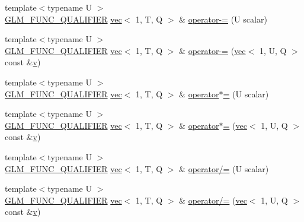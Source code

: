 \begin{DoxyCompactItemize}
{\footnotesize template$<$typename U $>$ }\\\mbox{\hyperlink{setup_8hpp_a33fdea6f91c5f834105f7415e2a64407}{G\+L\+M\+\_\+\+F\+U\+N\+C\+\_\+\+Q\+U\+A\+L\+I\+F\+I\+ER}} \mbox{\hyperlink{structglm_1_1vec}{vec}}$<$ 1, T, Q $>$ \& \mbox{\hyperlink{structglm_1_1vec_3_011_00_01_t_00_01_q_01_4_ad8f1f7c45247e319031b4763b1b5d8e5}{operator-\/=}} (U scalar)
\item 
{\footnotesize template$<$typename U $>$ }\\\mbox{\hyperlink{setup_8hpp_a33fdea6f91c5f834105f7415e2a64407}{G\+L\+M\+\_\+\+F\+U\+N\+C\+\_\+\+Q\+U\+A\+L\+I\+F\+I\+ER}} \mbox{\hyperlink{structglm_1_1vec}{vec}}$<$ 1, T, Q $>$ \& \mbox{\hyperlink{structglm_1_1vec_3_011_00_01_t_00_01_q_01_4_af7f71fdf4777a81e3c86efae282ca96e}{operator-\/=}} (\mbox{\hyperlink{structglm_1_1vec}{vec}}$<$ 1, U, Q $>$ const \&\mbox{\hyperlink{_s_d_l__opengl_8h_a10a82eabcb59d2fcd74acee063775f90}{v}})
\item 
{\footnotesize template$<$typename U $>$ }\\\mbox{\hyperlink{setup_8hpp_a33fdea6f91c5f834105f7415e2a64407}{G\+L\+M\+\_\+\+F\+U\+N\+C\+\_\+\+Q\+U\+A\+L\+I\+F\+I\+ER}} \mbox{\hyperlink{structglm_1_1vec}{vec}}$<$ 1, T, Q $>$ \& \mbox{\hyperlink{structglm_1_1vec_3_011_00_01_t_00_01_q_01_4_a40577d349a0b2aa9cb5e8f516be56f5b}{operator$\ast$=}} (U scalar)
\item 
{\footnotesize template$<$typename U $>$ }\\\mbox{\hyperlink{setup_8hpp_a33fdea6f91c5f834105f7415e2a64407}{G\+L\+M\+\_\+\+F\+U\+N\+C\+\_\+\+Q\+U\+A\+L\+I\+F\+I\+ER}} \mbox{\hyperlink{structglm_1_1vec}{vec}}$<$ 1, T, Q $>$ \& \mbox{\hyperlink{structglm_1_1vec_3_011_00_01_t_00_01_q_01_4_ad99d855b46377ab71a047c3c62c41054}{operator$\ast$=}} (\mbox{\hyperlink{structglm_1_1vec}{vec}}$<$ 1, U, Q $>$ const \&\mbox{\hyperlink{_s_d_l__opengl_8h_a10a82eabcb59d2fcd74acee063775f90}{v}})
\item 
{\footnotesize template$<$typename U $>$ }\\\mbox{\hyperlink{setup_8hpp_a33fdea6f91c5f834105f7415e2a64407}{G\+L\+M\+\_\+\+F\+U\+N\+C\+\_\+\+Q\+U\+A\+L\+I\+F\+I\+ER}} \mbox{\hyperlink{structglm_1_1vec}{vec}}$<$ 1, T, Q $>$ \& \mbox{\hyperlink{structglm_1_1vec_3_011_00_01_t_00_01_q_01_4_a25bbfeb0e44bca9205cd7b127b566ba8}{operator/=}} (U scalar)
\item 
{\footnotesize template$<$typename U $>$ }\\\mbox{\hyperlink{setup_8hpp_a33fdea6f91c5f834105f7415e2a64407}{G\+L\+M\+\_\+\+F\+U\+N\+C\+\_\+\+Q\+U\+A\+L\+I\+F\+I\+ER}} \mbox{\hyperlink{structglm_1_1vec}{vec}}$<$ 1, T, Q $>$ \& \mbox{\hyperlink{structglm_1_1vec_3_011_00_01_t_00_01_q_01_4_a8bf658f58cfbd59ca4421fb0ba1b0eb5}{operator/=}} (\mbox{\hyperlink{structglm_1_1vec}{vec}}$<$ 1, U, Q $>$ const \&\mbox{\hyperlink{_s_d_l__opengl_8h_a10a82eabcb59d2fcd74acee063775f90}{v}})

\end{DoxyCompactItemize}
